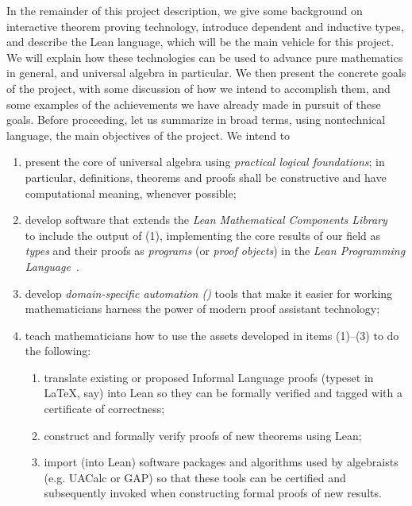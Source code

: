 \documentclass[11pt]{amsart}  %
\begin{document}
In the remainder of this project description, we give some background on interactive theorem proving technology, introduce dependent and inductive types, and describe the Lean language, which will be the main vehicle for this project. We will explain how these technologies can be used to advance pure mathematics in general, and universal algebra in particular. We then present the concrete goals of the project, with some discussion of how we intend to accomplish them, and some examples of the achievements we have already made in pursuit of these goals. Before proceeding, let us summarize in broad terms, using nontechnical language, the main objectives of the project. We intend to
\begin{enumerate}
  \item present the core of universal algebra using \emph{practical logical foundations}; in particular, definitions, theorems and proofs shall be constructive and have computational meaning, whenever possible;
  
  \item develop software that extends the \emph{Lean Mathematical Components Library}~\cite{lean-mathlib:2018} to include the output of (1), implementing the core results of our field as \emph{types} and their proofs as \emph{programs} (or \emph{proof objects}) in the \emph{Lean Programming Language}~\cite{lean,lean-ualib}.
        
  \item develop \emph{domain-specific automation (\dsa)} tools that make it easier for working mathematicians harness the power of modern proof assistant technology;
        
  \item teach mathematicians how to use the assets developed in items (1)--(3)
        to do the following:
  \begin{enumerate}[{\bf a.}]
    \item translate existing or proposed Informal Language proofs (typeset in \LaTeX, say) into Lean so they can be formally verified and tagged with a certificate of correctness;
    \item construct and formally verify proofs of new theorems using Lean;
    \item import (into Lean) software packages and algorithms used by algebraists 
    (e.g. UACalc or GAP) so that these tools can be certified and subsequently 
    invoked when constructing formal proofs of new results.
  \end{enumerate}
\end{enumerate}
\end{document}
